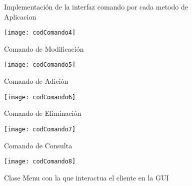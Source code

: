 \begin{figure}[H]
	\centering
	\caption{Implementación de la interfaz comando por cada metodo de Aplicacion}
	\texttt{[image: codComando4]}
	\caption{Comando de Modificación}
	\centering
	\label{fig:codComando4}
\end{figure}
\clearpage
\begin{figure}[H]
	\centering
	\texttt{[image: codComando5]}
	\centering
	\caption{Comando de Adición}
	\label{fig:codComando5}
\end{figure}

\begin{figure}[H]
	\centering
	\texttt{[image: codComando6]}
	\centering
	\caption{Comando de Eliminación}
	\label{fig:codComando6}
\end{figure}
\clearpage
\begin{figure}[H]
	\centering
	\texttt{[image: codComando7]}
	\centering
	\caption{Comando de Consulta}
	\label{fig:codComando7}
\end{figure}

\begin{figure}[H]
	\centering
	\texttt{[image: codComando8]}
	\centering
	\caption{Clase Menu con la que interactua el cliente en la GUI}
	\label{fig:codComando8}
\end{figure}

